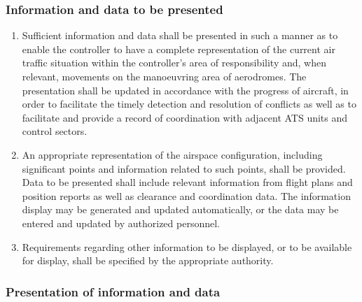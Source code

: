 \documentclass[../main.tex]{subfiles}
\begin{document}
    \subsubsection{Information and data to be presented}

    \begin{enumerate}
        \item Sufficient information and data shall be presented in such a manner as to enable the controller to have a complete representation of the current air traffic situation within the controller’s area of responsibility and, when relevant, movements on the manoeuvring area of aerodromes. The presentation shall be updated in accordance with the progress of aircraft, in order to facilitate the timely detection and resolution of conflicts as well as to facilitate and provide a record of coordination with adjacent ATS units and control sectors.
        \item An appropriate representation of the airspace configuration, including significant points and information related to such points, shall be provided. Data to be presented shall include relevant information from flight plans and position reports as well as clearance and coordination data. The information display may be generated and updated automatically, or the data may be entered and updated by authorized personnel.
        \item Requirements regarding other information to be displayed, or to be available for display, shall be specified by the appropriate authority.
    \end{enumerate}

    \subsubsection{Presentation of information and data}
\end{document}
